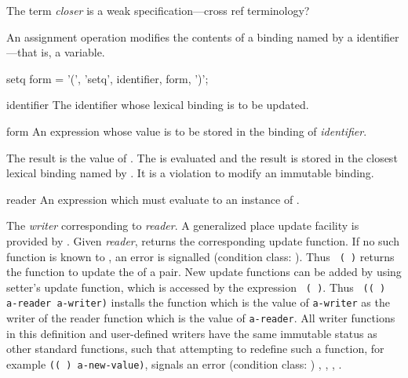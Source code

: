 %
\begin{optPrivate}
    The term {\em closer} is a weak specification---cross ref terminology?
\end{optPrivate}
%
\begin{optDefinition}
\noindent
An assignment operation modifies the contents of a
binding named by a identifier---that is, a variable.

%
\Syntax
\savesyntax\setqSyntax\vbox{\syntax
setq form
   = '(', 'setq', identifier, form, ')';
\endsyntax}
%
\begin{arguments}
    \item[identifier] The identifier whose lexical binding is to be updated.

    \item[form] An expression whose value is to be stored in the binding of {\em
        identifier}.
\end{arguments}
%
\result%
The result is the value of .
%
\remarks%
The  is evaluated and the result is stored in the closest lexical
binding named by .  It is a violation to modify an immutable
binding.

%
\begin{arguments}
    \item[reader] An expression which must evaluate to an instance of
    .
\end{arguments}
%
\result%
The {\em writer\/} corresponding to {\em reader}.
%
\remarks%
A generalized place update facility is provided by .  Given
{\em reader},  returns the
corresponding update function.  If no such
function is known to , an error is signalled (condition
class: ).  Thus {\tt
    ( )} returns the function to update the
 of a pair.  New update functions can be added by using
{setter}'s update function, which is accessed by the expression {\tt
    ( )}.  Thus {\tt
    (( ) a-reader a-writer)} installs
the function which is the value of {\tt a-writer} as the writer of the reader
function which is the value of {\tt a-reader}.  All writer functions in this
definition and user-defined writers have the same immutable status as other
standard functions, such that attempting to redefine such a function, for
example {\tt (( ) 
    a-new-value)}, signals an error (condition class:
)
%
\seealso%
, , ,
.


\end{optDefinition}
